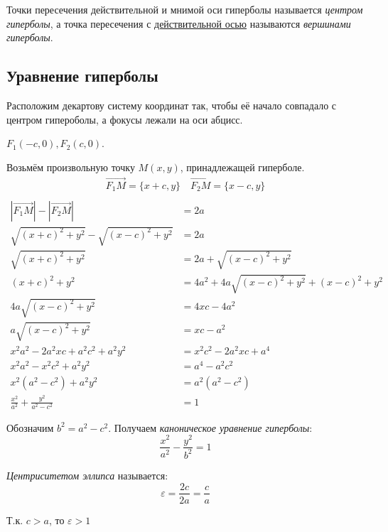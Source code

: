 Точки пересечения действительной и мнимой оси гиперболы называется \textit{центром гиперболы}, а точка пересечения с \underline{действительной осью} называются \textit{вершинами гиперболы}.

\subsection*{Уравнение гиперболы}

Расположим декартову систему координат так, чтобы её начало совпадало с центром гипероболы, а фокусы лежали на оси абцисс.

$F_1(-c, 0), F_2(c, 0)$.

Возьмём произвольную точку $M(x, y)$, принадлежащей гиперболе.
\begin{gather*}
  \overrightarrow{F_1M} = \{x + c, y\} \quad
  \overrightarrow{F_2M} = \{x - c, y\} \\
\end{gather*}
\begin{align*}
  |\overrightarrow{F_1M}| - |\overrightarrow{F_2M}| &= 2a \\
  \sqrt{(x + c)^2 + y^2} - \sqrt{(x - c)^2 + y^2} &= 2a \\
  \sqrt{(x + c)^2 + y^2} &= 2a + \sqrt{(x - c)^2 + y^2} \\
  (x + c)^2 + y^2 &= 4a^2 + 4a\sqrt{(x - c)^2 + y^2} + (x - c)^2 + y^2 \\
  4a\sqrt{(x - c)^2 + y^2} &= 4xc - 4a^2 \\
  a\sqrt{(x - c)^2 + y^2} &= xc - a^2 \\
  x^2 a^2 - 2a^2xc + a^2c^2 + a^2y^2 &= x^2c^2 - 2a^2xc + a^4 \\
  x^2a^2 - x^2c^2 + a^2y^2 &= a^4 - a^2c^2 \\
  x^2(a^2 - c^2) + a^2y^2 &= a^2(a^2 - c^2) \\
  \frac{x^2}{a^2} + \frac{y^2}{a^2 - c^2} &= 1
\end{align*}

Обозначим $b^2 = a^2 - c^2$. Получаем \textit{каноническое уравнение гиперболы}: \[
  \boxed{\frac{x^2}{a^2} - \frac{y^2}{b^2} = 1}
\]  

\textit{Центриситетом эллипса} называется: \[
\varepsilon = \frac{2c}{2a} = \frac{c}{a}
\] 
\begin{note}
  Т.к. $c > a$, то  $\varepsilon > 1$
\end{note}


